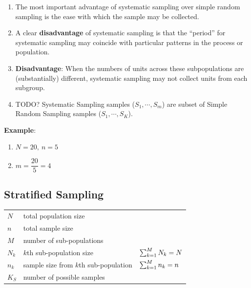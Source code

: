 \begin{enumerate}[itemsep=0.2cm]
    \item The most important advantage of systematic sampling over simple random sampling is the ease with which the sample may be collected.
    \hfill \cite{statistics/book/Statistics-for-Data-Scientists/Maurits-Kaptein}

    \item A clear \textbf{disadvantage} of systematic sampling is that the “period” for systematic sampling may coincide with particular patterns in the process or population.
    \hfill \cite{statistics/book/Statistics-for-Data-Scientists/Maurits-Kaptein}

    \item \textbf{Disadvantage}: When the numbers of units across these subpopulations are (substantially) different, systematic sampling may not collect units from each subgroup.
    \hfill \cite{statistics/book/Statistics-for-Data-Scientists/Maurits-Kaptein}

    \item TODO? Systematic Sampling samples ($S_1,\cdots,S_m$) are subset of Simple Random Sampling samples ($S_1,\cdots,S_K$).
\end{enumerate}

\vspace{0.5cm}
\textbf{Example}:
\begin{enumerate}[itemsep=0.3cm]
    \item[] $N = 20,\ n = 5$

    \item[] $m = \dfrac{20}{5}=4$

    
\end{enumerate}






\subsection{Stratified Sampling \cite{statistics/book/Statistics-for-Data-Scientists/Maurits-Kaptein}}\label{Sampling Plans/Representative Sampling/Stratified Sampling}

\begin{customArrayStretch}{1.3}
\begin{table}[H]
    \centering
    \begin{tabular}{l l l}
        $N$ & total population size & \\
        $n$ & total sample size & \\
        $M$ & number of sub-populations & \\
        $N_k$ & $k$th sub-population size & $\textstyle\sum_{k=1}^{M} N_k = N$ \\
        $n_k$ & sample size from $k$th sub-population & $\textstyle\sum_{k=1}^{M} n_k = n$ \\
        $K_S$ & number of possible samples \\
    \end{tabular}
\end{table}
\end{customArrayStretch}

